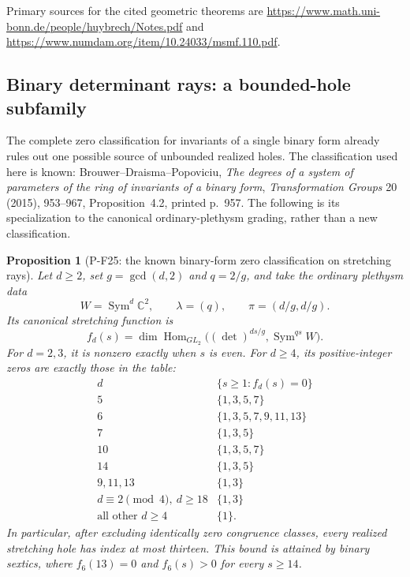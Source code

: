 \documentclass[11pt,a4paper]{article}
\newtheorem{proposition}{Proposition}[section]
\begin{document}
Primary sources for the cited geometric theorems are
\url{https://www.math.uni-bonn.de/people/huybrech/Notes.pdf}
and \url{https://www.numdam.org/item/10.24033/msmf.110.pdf}.


\subsection{Binary determinant rays: a bounded-hole subfamily}

The complete zero classification for invariants of a single binary form
already rules out one possible source of unbounded realized holes.
The classification used here is known: Brouwer--Draisma--Popoviciu,
\emph{The degrees of a system of parameters of the ring of invariants
of a binary form}, \emph{Transformation Groups} 20 (2015),
953--967, Proposition~4.2, printed p.~957. The following is its
specialization to the canonical ordinary-plethysm grading, rather
than a new classification.

\begin{proposition}[P-F25: the known binary-form zero classification on stretching rays]
\label{prop:binarydeterminantzeros}
Let $d\ge2$, set $g=\gcd(d,2)$ and $q=2/g$, and take the ordinary
plethysm data
\[
 W=\operatorname{Sym}^d\mathbb C^2,\qquad
 \lambda=(q),\qquad \pi=(d/g,d/g).
\]
Its canonical stretching function is
\[
 f_d(s)=\dim\operatorname{Hom}_{GL_2}
   \bigl((\det)^{ds/g},\operatorname{Sym}^{qs}W\bigr).
 \tag{B-H1}
\]
For $d=2,3$, it is nonzero exactly when $s$ is even.
For $d\ge4$, its positive-integer zeros are exactly those in the table:
\[
\begin{array}{c|l}
 d&\{s\ge1:f_d(s)=0\}\\ \hline
 5&\{1,3,5,7\}\\
 6&\{1,3,5,7,9,11,13\}\\
 7&\{1,3,5\}\\
 10&\{1,3,5,7\}\\
 14&\{1,3,5\}\\
 9,11,13&\{1,3\}\\
 d\equiv2\pmod4,\ d\ge18&\{1,3\}\\
 \text{all other }d\ge4&\{1\}.
\end{array}
 \tag{B-H2}
\]
In particular, after excluding identically zero congruence classes,
every realized stretching hole has index at most thirteen. This
bound is attained by binary sextics, where $f_6(13)=0$ and
$f_6(s)>0$ for every $s\ge14$.
\end{proposition}
\end{document}
